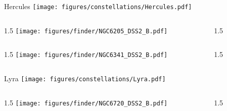 \documentclass[final]{beamer}
\newlength{\colwidth}
\begin{document}

\begin{frame}[t]{\LARGE Hercules}
    \centering
    \texttt{[image: figures/constellations/Hercules.pdf]}
\end{frame}


\begin{frame}[t]{}
    \begin{columns}[T]
        \begin{column}{1.5\colwidth}
            \centering
            \texttt{[image: figures/finder/NGC6205\_DSS2\_B.pdf]}
        \end{column}
        \begin{column}{1.5\colwidth}
            \Large
            
        \end{column}
    \end{columns}
    \vspace{\fill}
    \begin{columns}[T]
        \begin{column}{1.5\colwidth}
            \centering
            \texttt{[image: figures/finder/NGC6341\_DSS2\_B.pdf]}
        \end{column}
        \begin{column}{1.5\colwidth}
            \Large
            
        \end{column}
    \end{columns}
\end{frame}


\begin{frame}[t]{\LARGE Lyra}
    \centering
    \texttt{[image: figures/constellations/Lyra.pdf]}
\end{frame}


\begin{frame}[t]{}
    \begin{columns}[T]
        \begin{column}{1.5\colwidth}
            \centering
            \texttt{[image: figures/finder/NGC6720\_DSS2\_B.pdf]}
        \end{column}
        \begin{column}{1.5\colwidth}
            \Large
            
        \end{column}
    \end{columns}
    \vspace{\fill}
\end{frame}
\end{document}
